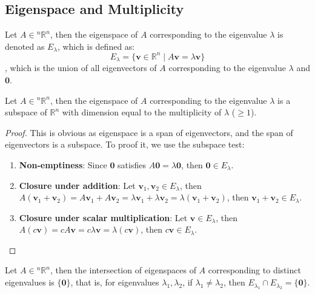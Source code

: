 \documentclass[11pt]{article}
\begin{document}
\subsection{Eigenspace and Multiplicity}
\begin{definition}[Eigenspace]
    Let $A \in {^n\mathbb{R}^n}$, then the eigenspace of $A$ corresponding to the eigenvalue $\lambda$ is denoted as $E_\lambda$, which is defined as:
    \begin{equation}
        E_\lambda = \{ \textbf{v} \in \mathbb{R}^n \mid A\textbf{v} = \lambda \textbf{v} \}
    \end{equation}
    , which is the union of all eigenvectors of $A$ corresponding to the eigenvalue $\lambda$ and ${\textbf{0}}$.
\end{definition}
\begin{theorem}
    Let $A \in {^n\mathbb{R}^n}$, then the eigenspace of $A$ corresponding to the eigenvalue $\lambda$ is a subspace of $\mathbb{R}^n$ with dimension equal to the multiplicity of $\lambda$ ($\ge 1$).
\end{theorem}
\begin{proof}
    This is obvious as eigenspace is a span of eigenvectors, and the span of eigenvectors is a subspace. To proof it, we use the subspace test:
    \begin{enumerate}
        \item \textbf{Non-emptiness}: Since $\textbf{0}$ satisfies $A\textbf{0} = \lambda \textbf{0}$, then $\textbf{0} \in E_\lambda$.
        \item \textbf{Closure under addition}: Let $\textbf{v}_1, \textbf{v}_2 \in E_\lambda$, then $A(\textbf{v}_1 + \textbf{v}_2) = A\textbf{v}_1 + A\textbf{v}_2 = \lambda \textbf{v}_1 + \lambda \textbf{v}_2 = \lambda(\textbf{v}_1 + \textbf{v}_2)$, then $\textbf{v}_1 + \textbf{v}_2 \in E_\lambda$.
        \item \textbf{Closure under scalar multiplication}: Let $\textbf{v} \in E_\lambda$, then $A(c\textbf{v}) = cA\textbf{v} = c\lambda \textbf{v} = \lambda(c\textbf{v})$, then $c\textbf{v} \in E_\lambda$.
    \end{enumerate}
\end{proof}
\begin{theorem}
    Let $A \in {^n\mathbb{R}^n}$, then the intersection of eigenspaces of $A$ corresponding to distinct eigenvalues is $\{\textbf{0}\}$, that is, for eigenvalues $\lambda_1, \lambda_2$, if $\lambda_1 \neq \lambda_2$, then $E_{\lambda_1} \cap E_{\lambda_2} = \{\textbf{0}\}$.
\end{theorem}
\end{document}
